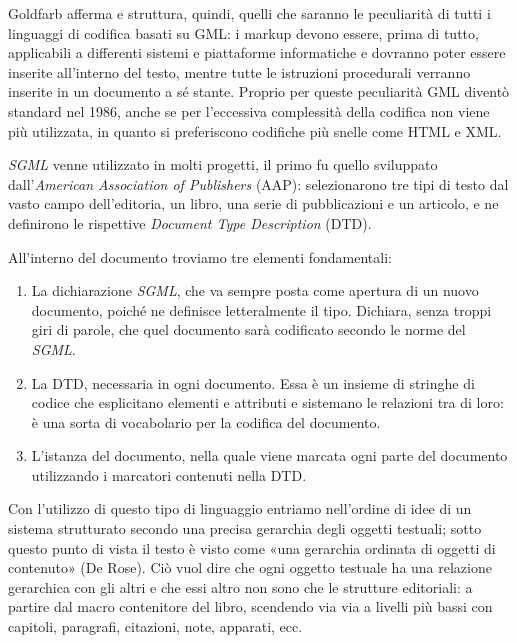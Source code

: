 \documentclass[
  b5paper,
  twoside,
  11pt,
  chapterprefix=false,
  bibliography=totocnumbered,
  listof=flat]{scrbook}
\begin{document}
Goldfarb afferma e struttura, quindi, quelli che saranno le peculiarità
di tutti i linguaggi di codifica basati su GML: i markup devono essere,
prima di tutto, applicabili a differenti sistemi e piattaforme
informatiche e dovranno poter essere inserite all'interno del testo,
mentre tutte le istruzioni procedurali verranno inserite in un documento
a sé stante. Proprio per queste peculiarità GML diventò standard nel
1986, anche se per l'eccessiva complessità della codifica non viene più
utilizzata, in quanto si preferiscono codifiche più snelle come HTML e
XML.

\emph{SGML} venne utilizzato in molti progetti, il primo fu quello sviluppato
dall'\emph{American Association of Publishers} (AAP): selezionarono tre tipi
di testo dal vasto campo dell'editoria, un libro, una serie di
pubblicazioni e un articolo, e ne definirono le rispettive \emph{Document
Type Description} (DTD).

All'interno del documento troviamo tre elementi fondamentali:

\begin{enumerate}
\def\labelenumi{\arabic{enumi}.}
\item
  La dichiarazione \emph{SGML}, che va sempre posta come apertura di un
  nuovo documento, poiché ne definisce letteralmente il tipo.
  Dichiara, senza troppi giri di parole, che quel documento sarà
  codificato secondo le norme del \emph{SGML}.
\item
  La DTD, necessaria in ogni documento. Essa è un insieme di stringhe
  di codice che esplicitano elementi e attributi e sistemano le
  relazioni tra di loro: è una sorta di vocabolario per la codifica
  del documento.
\item
  L'istanza del documento, nella quale viene marcata ogni parte del
  documento utilizzando i marcatori contenuti nella DTD.
\end{enumerate}

Con l'utilizzo di questo tipo di linguaggio entriamo nell'ordine di idee
di un sistema strutturato secondo una precisa gerarchia degli oggetti
testuali; sotto questo punto di vista il testo è visto come «una
gerarchia ordinata di oggetti di contenuto» (De Rose). Ciò vuol dire che
ogni oggetto testuale ha una relazione gerarchica con gli altri e che
essi altro non sono che le strutture editoriali: a partire dal macro
contenitore del libro, scendendo via via a livelli più bassi con
capitoli, paragrafi, citazioni, note, apparati, ecc.
\end{document}
